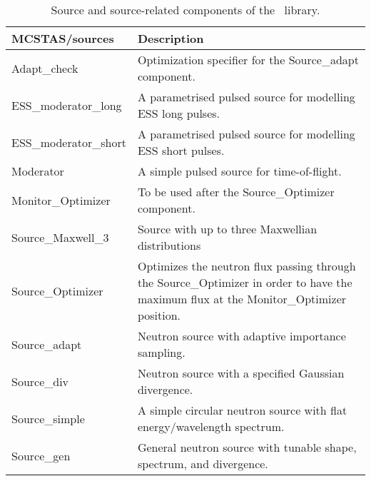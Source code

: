 \begin{table}
  \begin{center}
    {\let\my=\\
    \begin{tabular}{|p{}|p{}|}
      \hline
       {\bf MCSTAS/sources} & Description \\
       \hline
Adapt\_check & Optimization specifier for the Source\_adapt component. \\
ESS\_moderator\_long & A parametrised pulsed source for modelling ESS long pulses. \\
ESS\_moderator\_short & A parametrised pulsed source for modelling ESS short pulses. \\
Moderator  & A simple pulsed source for time-of-flight. \\
Monitor\_Optimizer &  To be used after the Source\_Optimizer component. \\
Source\_Maxwell\_3 & Source with up to three Maxwellian distributions \\
Source\_Optimizer & Optimizes the neutron flux passing through the Source\_Optimizer in order to have the maximum flux at the Monitor\_Optimizer position. \\
Source\_adapt  &       Neutron source with adaptive importance sampling. \\
Source\_div &          Neutron source with a specified Gaussian divergence. \\
Source\_simple &  A simple circular neutron source with flat energy/wavelength spectrum.\\
Source\_gen     &    General neutron source with tunable shape, spectrum,
                     and divergence. \\
      \hline
    \end{tabular}
    \caption{Source and source-related components of the \MCS\ library.}
    \label{t:comp-sources}
    }
  \end{center}
\end{table}


